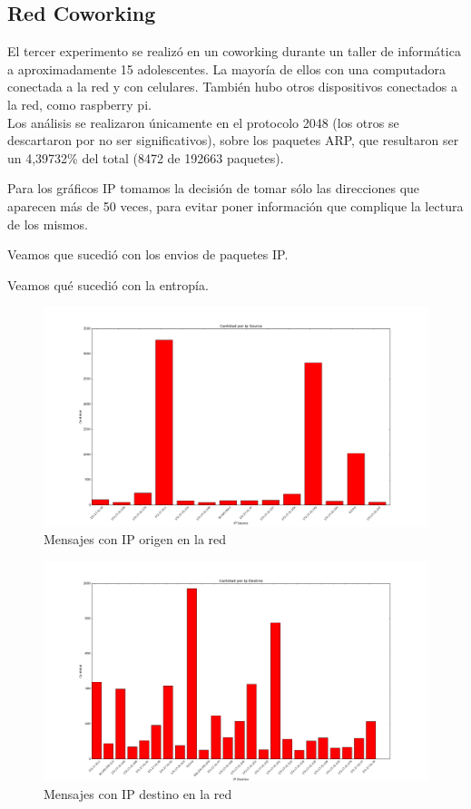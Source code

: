 

\newpage

\subsection{Red Coworking}

El tercer experimento se realiz\'o en un coworking durante un taller de inform\'atica
a aproximadamente 15 adolescentes. La mayor\'ia de ellos con una computadora conectada a la red y con celulares.
Tambi\'en hubo otros dispositivos conectados a la red, como raspberry pi.\\

Los an\'alisis se realizaron \'unicamente en el protocolo 2048 (los otros se descartaron por no ser significativos),
 sobre los paquetes ARP, que resultaron ser un 4,39732\% del total (8472 de 192663 paquetes).

Para los gr\'aficos IP tomamos la decisi\'on de tomar s\'olo las direcciones que aparecen m\'as de 50 veces, para
evitar poner informaci\'on que complique la lectura de los mismos.

Veamos que sucedi\'o con los envios de paquetes IP.

Veamos qu\'e sucedi\'o con la entrop\'ia.


\begin{figure}[h!]
\centering
\includegraphics[width=0.7\linewidth]{imagenes/exp3/CantIpSource.png}
\caption{Mensajes con IP origen en la red}
\label{exp3grafico1}
\end{figure}

\begin{figure}[h!]
\centering
\includegraphics[width=0.7\linewidth]{imagenes/exp3/CantIpDest.png}
\caption{Mensajes con IP destino en la red}
\label{exp3grafico2}
\end{figure}


